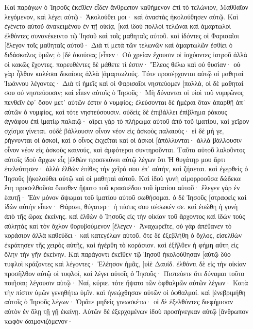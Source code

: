 Καὶ παράγων ὁ Ἰησοῦς ἐκεῖθεν εἶδεν ἄνθρωπον καθήμενον ἐπὶ τὸ τελώνιον, Μαθθαῖον λεγόμενον, καὶ λέγει αὐτῷ· Ἀκολούθει μοι· καὶ ἀναστὰς ἠκολούθησεν αὐτῷ. 
Καὶ ἐγένετο αὐτοῦ ἀνακειμένου ἐν τῇ οἰκίᾳ, [καὶ ἰδοὺ πολλοὶ τελῶναι καὶ ἁμαρτωλοὶ ἐλθόντες συνανέκειντο τῷ Ἰησοῦ καὶ τοῖς μαθηταῖς αὐτοῦ. 
καὶ ἰδόντες οἱ Φαρισαῖοι [ἔλεγον τοῖς μαθηταῖς αὐτοῦ· Διὰ τί μετὰ τῶν τελωνῶν καὶ ἁμαρτωλῶν ἐσθίει ὁ διδάσκαλος ὑμῶν; 
ὁ [δὲ ἀκούσας [εἶπεν· Οὐ χρείαν ἔχουσιν οἱ ἰσχύοντες ἰατροῦ ἀλλὰ οἱ κακῶς ἔχοντες. 
πορευθέντες δὲ μάθετε τί ἐστιν· Ἔλεος θέλω καὶ οὐ θυσίαν· οὐ γὰρ ἦλθον καλέσαι δικαίους ἀλλὰ [ἁμαρτωλούς. 
Τότε προσέρχονται αὐτῷ οἱ μαθηταὶ Ἰωάννου λέγοντες· Διὰ τί ἡμεῖς καὶ οἱ Φαρισαῖοι νηστεύομεν [πολλά, οἱ δὲ μαθηταί σου οὐ νηστεύουσιν; 
καὶ εἶπεν αὐτοῖς ὁ Ἰησοῦς· Μὴ δύνανται οἱ υἱοὶ τοῦ νυμφῶνος πενθεῖν ἐφ᾽ ὅσον μετ᾽ αὐτῶν ἐστιν ὁ νυμφίος; ἐλεύσονται δὲ ἡμέραι ὅταν ἀπαρθῇ ἀπ᾽ αὐτῶν ὁ νυμφίος, καὶ τότε νηστεύσουσιν. 
οὐδεὶς δὲ ἐπιβάλλει ἐπίβλημα ῥάκους ἀγνάφου ἐπὶ ἱματίῳ παλαιῷ· αἴρει γὰρ τὸ πλήρωμα αὐτοῦ ἀπὸ τοῦ ἱματίου, καὶ χεῖρον σχίσμα γίνεται. 
οὐδὲ βάλλουσιν οἶνον νέον εἰς ἀσκοὺς παλαιούς· εἰ δὲ μή γε, ῥήγνυνται οἱ ἀσκοί, καὶ ὁ οἶνος ἐκχεῖται καὶ οἱ ἀσκοὶ [ἀπόλλυνται· ἀλλὰ βάλλουσιν οἶνον νέον εἰς ἀσκοὺς καινούς, καὶ ἀμφότεροι συντηροῦνται. 
Ταῦτα αὐτοῦ λαλοῦντος αὐτοῖς ἰδοὺ ἄρχων εἷς [ἐλθὼν προσεκύνει αὐτῷ λέγων ὅτι Ἡ θυγάτηρ μου ἄρτι ἐτελεύτησεν· ἀλλὰ ἐλθὼν ἐπίθες τὴν χεῖρά σου ἐπ᾽ αὐτήν, καὶ ζήσεται. 
καὶ ἐγερθεὶς ὁ Ἰησοῦς [ἠκολούθει αὐτῷ καὶ οἱ μαθηταὶ αὐτοῦ. 
Καὶ ἰδοὺ γυνὴ αἱμορροοῦσα δώδεκα ἔτη προσελθοῦσα ὄπισθεν ἥψατο τοῦ κρασπέδου τοῦ ἱματίου αὐτοῦ· 
ἔλεγεν γὰρ ἐν ἑαυτῇ· Ἐὰν μόνον ἅψωμαι τοῦ ἱματίου αὐτοῦ σωθήσομαι. 
ὁ δὲ Ἰησοῦς [στραφεὶς καὶ ἰδὼν αὐτὴν εἶπεν· Θάρσει, θύγατερ· ἡ πίστις σου σέσωκέν σε. καὶ ἐσώθη ἡ γυνὴ ἀπὸ τῆς ὥρας ἐκείνης. 
καὶ ἐλθὼν ὁ Ἰησοῦς εἰς τὴν οἰκίαν τοῦ ἄρχοντος καὶ ἰδὼν τοὺς αὐλητὰς καὶ τὸν ὄχλον θορυβούμενον 
[ἔλεγεν· Ἀναχωρεῖτε, οὐ γὰρ ἀπέθανεν τὸ κοράσιον ἀλλὰ καθεύδει· καὶ κατεγέλων αὐτοῦ. 
ὅτε δὲ ἐξεβλήθη ὁ ὄχλος, εἰσελθὼν ἐκράτησεν τῆς χειρὸς αὐτῆς, καὶ ἠγέρθη τὸ κοράσιον. 
καὶ ἐξῆλθεν ἡ φήμη αὕτη εἰς ὅλην τὴν γῆν ἐκείνην. 
Καὶ παράγοντι ἐκεῖθεν τῷ Ἰησοῦ ἠκολούθησαν [αὐτῷ δύο τυφλοὶ κράζοντες καὶ λέγοντες· Ἐλέησον ἡμᾶς, [υἱὲ Δαυίδ. 
ἐλθόντι δὲ εἰς τὴν οἰκίαν προσῆλθον αὐτῷ οἱ τυφλοί, καὶ λέγει αὐτοῖς ὁ Ἰησοῦς· Πιστεύετε ὅτι δύναμαι τοῦτο ποιῆσαι; λέγουσιν αὐτῷ· Ναί, κύριε. 
τότε ἥψατο τῶν ὀφθαλμῶν αὐτῶν λέγων· Κατὰ τὴν πίστιν ὑμῶν γενηθήτω ὑμῖν. 
καὶ ἠνεῴχθησαν αὐτῶν οἱ ὀφθαλμοί. καὶ [ἐνεβριμήθη αὐτοῖς ὁ Ἰησοῦς λέγων· Ὁρᾶτε μηδεὶς γινωσκέτω· 
οἱ δὲ ἐξελθόντες διεφήμισαν αὐτὸν ἐν ὅλῃ τῇ γῇ ἐκείνῃ. 
Αὐτῶν δὲ ἐξερχομένων ἰδοὺ προσήνεγκαν αὐτῷ [ἄνθρωπον κωφὸν δαιμονιζόμενον· 
